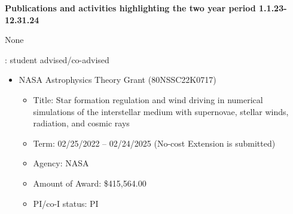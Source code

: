 \documentclass[12pt]{article}
\begin{document}
\begin{center}
{\large \bf Publications and activities highlighting the two year period 1.1.23-12.31.24}
\end{center}


None


: student advised/co-advised

\begin{itemize}[itemsep=0pt,topsep=\parskip]
    \small 
\end{itemize}


\begin{itemize}[itemsep=0pt,topsep=\parskip]
    \small 
\end{itemize}


\begin{itemize}
    \item NASA Astrophysics Theory Grant (80NSSC22K0717)
    \begin{itemize}
        \item Title: Star formation regulation and wind driving in numerical simulations of the interstellar medium with supernovae, stellar winds, radiation, and cosmic rays
        \item Term: 02/25/2022 -- 02/24/2025 (No-cost Extension is submitted)
        \item Agency: NASA
        \item Amount of Award: \$415,564.00
        \item PI/co-I status: PI
    \end{itemize}
\end{itemize}

\end{document}
